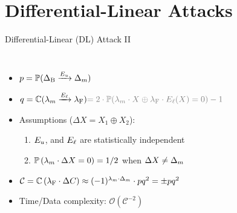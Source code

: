 \section*{Differential-Linear Attacks}

\begin{frame}{Differential-Linear (DL) Attack II \cite{dl_crypto_LangfordH94}}
\vspace{-0.2cm}
\begin{columns}
\begin{itemize}
  \small
  \item $p = \mathbb{P}(\Delta_{\textrm{B}} \xrightarrow{E_{u}}\Delta_{m})$
  \item $q = \corr(\lambda\Mid \xrightarrow{E\Low} \lambda\Out) \textcolor{gray}{ = 2\cdot \pr(\lambda\Mid\cdot X \oplus \lambda\Out\cdot E\Low(X) = 0) - 1}$
  \item Assumptions ($\Delta X = X_{1} \oplus X_{2}$):
  \begin{enumerate}
    \small
    \item $E_{u}$, and $E_{\ell}$ are statistically independent
    \item $\mathbb{P}\left(\lambda_{m} \cdot \Delta X = 0\right) = 1/2$ when $\Delta X \neq \Delta_{m}$
  \end{enumerate}
  \item $\mathcal{C} = \mathbb{C}\left(\lambda_{\textrm{F}}\cdot \Delta C\right) \approx (-1)^{\lambda_{m}\cdot\Delta_{m}} \cdot p q^{2} = \pm p q^{2}$
  \item Time/Data complexity: $\mathcal{O}(\mathcal{C}^{-2})$
\end{itemize}
\begin{center}
\end{center}
\end{columns}
\end{frame}
